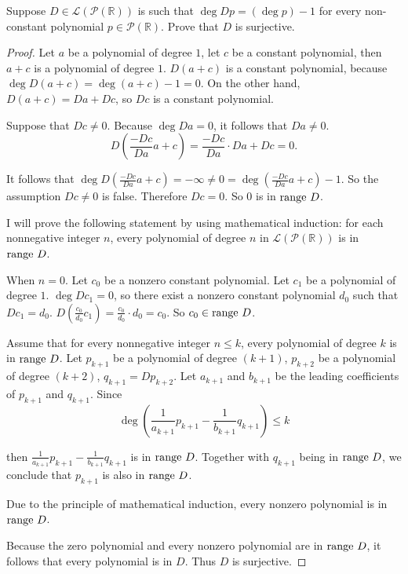 \begin{exercise}
    Suppose $D \in \mathcal{L}(\mathcal{P}(\mathbb{R}))$ is such that $\deg Dp = (\deg p) - 1$ for every non-constant polynomial $p \in \mathcal{P}(\mathbb{R})$. Prove that $D$ is surjective.
\end{exercise}

\begin{proof}
    Let $a$ be a polynomial of degree $1$, let $c$ be a constant polynomial, then $a + c$ is a polynomial of degree $1$. $D(a + c)$ is a constant polynomial, because $\deg D(a+c) = \deg (a + c) - 1 = 0$. On the other hand, $D(a + c) = Da + Dc$, so $Dc$ is a constant polynomial.

    Suppose that $Dc\ne 0$. Because $\deg Da = 0$, it follows that $Da\ne 0$.
    \[
        D\left(\frac{-Dc}{Da}a + c\right) = \frac{-Dc}{Da}\cdot Da + Dc = 0.
    \]

    It follows that $\deg D\left(\frac{-Dc}{Da}a + c\right) = -\infty \ne 0 = \deg\left(\frac{-Dc}{Da}a + c\right) - 1$. So the assumption $Dc\ne 0$ is false. Therefore $Dc = 0$. So $0$ is in $\operatorname{range}\,{D}$.

    I will prove the following statement by using mathematical induction: for each nonnegative integer $n$, every polynomial of degree $n$ in $\mathcal{L}(\mathcal{P}(\mathbb{R}))$ is in $\operatorname{range}\,{D}$.

    When $n = 0$. Let $c_{0}$ be a nonzero constant polynomial. Let $c_{1}$ be a polynomial of degree $1$. $\deg Dc_{1} = 0$, so there exist a nonzero constant polynomial $d_{0}$ such that $Dc_{1} = d_{0}$. $D\left(\frac{c_{0}}{d_{0}}c_{1}\right) = \frac{c_{0}}{d_{0}}\cdot d_{0} = c_{0}$. So $c_{0}\in\operatorname{range}\,{D}$.

    Assume that for every nonnegative integer $n\leq k$, every polynomial of degree $k$ is in $\operatorname{range}\,{D}$. Let $p_{k+1}$ be a polynomial of degree $(k+1)$, $p_{k+2}$ be a polynomial of degree $(k+2)$, $q_{k+1} = Dp_{k+2}$. Let $a_{k+1}$ and $b_{k+1}$ be the leading coefficients of $p_{k+1}$ and $q_{k+1}$. Since
    \[
        \deg\left(\frac{1}{a_{k+1}}p_{k+1} - \frac{1}{b_{k+1}}q_{k+1}\right) \leq k
    \]

    then $\frac{1}{a_{k+1}}p_{k+1} - \frac{1}{b_{k+1}}q_{k+1}$ is in $\operatorname{range}\,{D}$. Together with $q_{k+1}$ being in $\operatorname{range}\,{D}$, we conclude that $p_{k+1}$ is also in $\operatorname{range}\,{D}$.

    Due to the principle of mathematical induction, every nonzero polynomial is in $\operatorname{range}\,{D}$.

    Because the zero polynomial and every nonzero polynomial are in $\operatorname{range}\,{D}$, it follows that every polynomial is in $D$. Thus $D$ is surjective.
\end{proof}
\newpage

